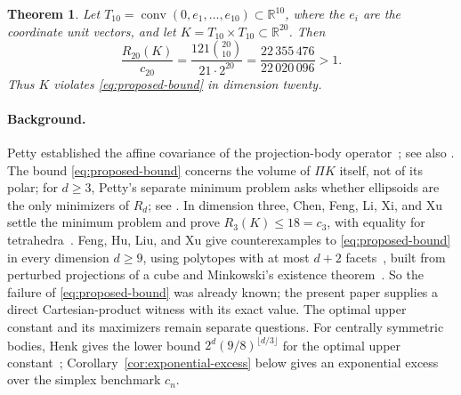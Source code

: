 \documentclass[11pt]{article}
\newtheorem{theorem}{Theorem}
\newcommand{\R}{\mathbb R}
\DeclareMathOperator{\conv}{conv}
\begin{document}
\begin{theorem}\label{thm:counterexample}
Let \(T_{10}=\conv(0,e_1,\ldots,e_{10})\subset\R^{10}\), where the \(e_i\) are the coordinate unit vectors, and let \(K=T_{10}\times T_{10}\subset\R^{20}\). Then
\[
 \frac{R_{20}(K)}{c_{20}}
 =\frac{121\binom{20}{10}}{21\cdot2^{20}}
 =\frac{22\,355\,476}{22\,020\,096}>1.
\]
Thus \(K\) violates \eqref{eq:proposed-bound} in dimension twenty.
\end{theorem}

\paragraph{Background.}
Petty established the affine covariance of the projection-body operator~\cite{Petty}; see also \cite[Equation~(1)]{Ludwig}. The bound \eqref{eq:proposed-bound} concerns the volume of \(\Pi K\) itself, not of its polar; for \(d\ge3\), Petty's separate minimum problem asks whether ellipsoids are the only minimizers of \(R_d\); see \cite[Section~1]{Saroglou}. In dimension three, Chen, Feng, Li, Xi, and Xu settle the minimum problem and prove \(R_3(K)\le18=c_3\), with equality for tetrahedra~\cite[Theorems~1.1 and~1.2]{ChenEtAl}. Feng, Hu, Liu, and Xu give counterexamples to \eqref{eq:proposed-bound} in every dimension \(d\ge9\), using polytopes with at most \(d+2\) facets~\cite[Theorem~1.3]{FengEtAl}, built from perturbed projections of a cube and Minkowski's existence theorem~\cite[Section~4]{FengEtAl}. So the failure of \eqref{eq:proposed-bound} was already known; the present paper supplies a direct Cartesian-product witness with its exact value. The optimal upper constant and its maximizers remain separate questions. For centrally symmetric bodies, Henk gives the lower bound \(2^d(9/8)^{\lfloor d/3\rfloor}\) for the optimal upper constant~\cite{Henk}; Corollary~\ref{cor:exponential-excess} below gives an exponential excess over the simplex benchmark \(c_n\).
\end{document}
